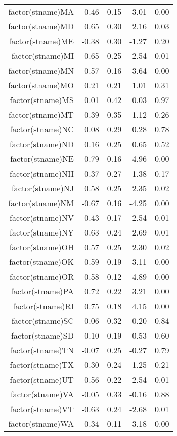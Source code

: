 \begin{table}[ht]
\begin{tabular}{rrrrr}
  factor(stname)MA & 0.46 & 0.15 & 3.01 & 0.00 \\ 
  factor(stname)MD & 0.65 & 0.30 & 2.16 & 0.03 \\ 
  factor(stname)ME & -0.38 & 0.30 & -1.27 & 0.20 \\ 
  factor(stname)MI & 0.65 & 0.25 & 2.54 & 0.01 \\ 
  factor(stname)MN & 0.57 & 0.16 & 3.64 & 0.00 \\ 
  factor(stname)MO & 0.21 & 0.21 & 1.01 & 0.31 \\ 
  factor(stname)MS & 0.01 & 0.42 & 0.03 & 0.97 \\ 
  factor(stname)MT & -0.39 & 0.35 & -1.12 & 0.26 \\ 
  factor(stname)NC & 0.08 & 0.29 & 0.28 & 0.78 \\ 
  factor(stname)ND & 0.16 & 0.25 & 0.65 & 0.52 \\ 
  factor(stname)NE & 0.79 & 0.16 & 4.96 & 0.00 \\ 
  factor(stname)NH & -0.37 & 0.27 & -1.38 & 0.17 \\ 
  factor(stname)NJ & 0.58 & 0.25 & 2.35 & 0.02 \\ 
  factor(stname)NM & -0.67 & 0.16 & -4.25 & 0.00 \\ 
  factor(stname)NV & 0.43 & 0.17 & 2.54 & 0.01 \\ 
  factor(stname)NY & 0.63 & 0.24 & 2.69 & 0.01 \\ 
  factor(stname)OH & 0.57 & 0.25 & 2.30 & 0.02 \\ 
  factor(stname)OK & 0.59 & 0.19 & 3.11 & 0.00 \\ 
  factor(stname)OR & 0.58 & 0.12 & 4.89 & 0.00 \\ 
  factor(stname)PA & 0.72 & 0.22 & 3.21 & 0.00 \\ 
  factor(stname)RI & 0.75 & 0.18 & 4.15 & 0.00 \\ 
  factor(stname)SC & -0.06 & 0.32 & -0.20 & 0.84 \\ 
  factor(stname)SD & -0.10 & 0.19 & -0.53 & 0.60 \\ 
  factor(stname)TN & -0.07 & 0.25 & -0.27 & 0.79 \\ 
  factor(stname)TX & -0.30 & 0.24 & -1.25 & 0.21 \\ 
  factor(stname)UT & -0.56 & 0.22 & -2.54 & 0.01 \\ 
  factor(stname)VA & -0.05 & 0.33 & -0.16 & 0.88 \\ 
  factor(stname)VT & -0.63 & 0.24 & -2.68 & 0.01 \\ 
  factor(stname)WA & 0.34 & 0.11 & 3.18 & 0.00 \\ 

\end{tabular}
\end{table}
